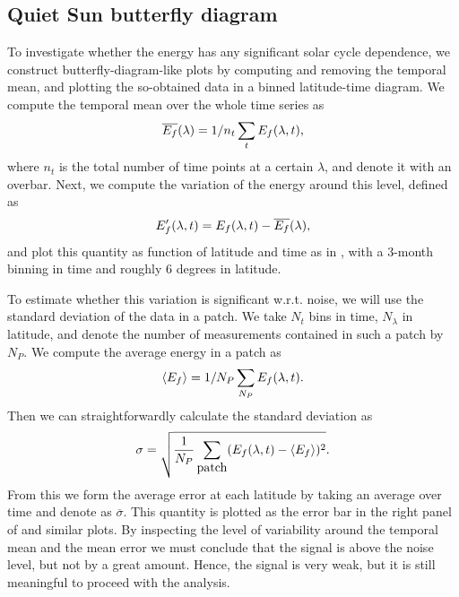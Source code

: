 \documentclass{aa}
\begin{document}
\subsection{Quiet Sun \fff butterfly diagram}\label{qsf}


To investigate whether the \fff energy has any significant solar cycle dependence, we construct butterfly-diagram-like plots by computing and removing the temporal mean, and plotting the so-obtained data in a binned latitude-time diagram. 
We compute the temporal mean over the whole time series as 
\begin{equation}
    \overline{E_f}(\lambda) = 1/n_t \sum_t E_f(\lambda,t),
\end{equation}
where $n_t$ is the total number of time points at a certain $\lambda$, and denote it with an overbar. Next, we compute the variation of the \fff energy around this level, defined as
\begin{equation}
    E_f'(\lambda,t)=E_f(\lambda,t)-\overline{E_f}(\lambda),
\end{equation}
and plot this quantity as function of latitude and time as in , with a 3-month binning in time and roughly 6 degrees in latitude. 

To estimate whether this variation is significant w.r.t. noise, we will use the standard deviation of the data in a patch.
We take $N_t$ bins in time, $N_\lambda$ in latitude, and denote the number of \ef measurements contained in such a patch by $N_P$. We compute the average \fff energy in a patch as
\begin{equation}
\langle E_f \rangle=1/N_P \sum_{N_P} E_f (\lambda,t).
\end{equation}
Then we can straightforwardly calculate the standard deviation as
\begin{equation}
\sigma= \sqrt{\frac{1}{N_P}\sum_{\mbox{patch}} ( E_f(\lambda,t)
- \left<{E_f} \right>)^2}.
\end{equation}
From this we form the average error at each latitude by taking an average over time and denote as $\overline{\sigma}$. 
This quantity is plotted as the error bar in the right panel of  and similar plots.
By inspecting the level of variability around the temporal mean and the mean error we must conclude that the signal is above the noise level, but not by a great amount. Hence, the signal is very weak, but it is still meaningful to proceed with the analysis.
\end{document}
